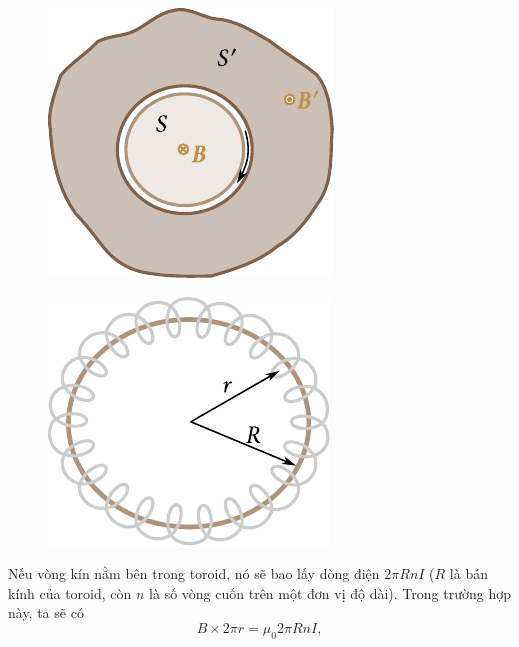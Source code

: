\begin{figure}[t]
	\begin{minipage}[t]{0.48\linewidth}
		\begin{center}
			\includegraphics[scale=1]{figures/ch_06/fig_6_31.pdf}
			\caption[]{}
			\label{fig:6_31}
		\end{center}
	\end{minipage}
	\hfill{ }%
	\begin{minipage}[t]{0.48\linewidth}
		\begin{center}
			\includegraphics[scale=1]{figures/ch_06/fig_6_32.pdf}
			\caption[]{}
			\label{fig:6_32}
		\end{center}
	\end{minipage}
\vspace{-0.4cm}
\end{figure}

Nếu vòng kín nằm bên trong toroid, nó sẽ bao lấy dòng điện $2\pi RnI$ ($R$ là bán kính của toroid, còn $n$ là số vòng cuốn trên một đơn vị độ dài). Trong trường hợp này, ta sẽ có
\begin{equation*}
    B \times 2\pi r = \mu_0 2\pi R n I,
\end{equation*}

